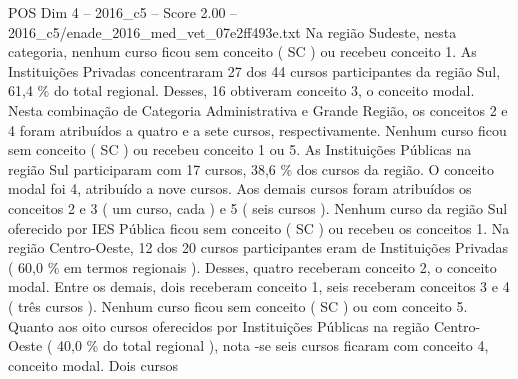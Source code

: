 \begin{textsample}{POS Dim 4 – 2016\_c5 – Score 2.00 – 2016\_c5/enade\_2016\_med\_vet\_07e2ff493e.txt}
Na região Sudeste, nesta categoria, nenhum curso ficou sem conceito ( SC ) ou recebeu conceito 1.
As Instituições Privadas concentraram 27 dos 44 cursos participantes da região Sul, 61,4 \% do total regional.
Desses, 16 obtiveram conceito 3, o conceito modal.
Nesta combinação de Categoria Administrativa e Grande Região, os conceitos 2 e 4 foram atribuídos a quatro e a sete cursos, respectivamente.
Nenhum curso ficou sem conceito ( SC ) ou recebeu conceito 1 ou 5.
As Instituições Públicas na região Sul participaram com 17 cursos, 38,6 \% dos cursos da região.
O conceito modal foi 4, atribuído a nove cursos.
Aos demais cursos foram atribuídos os conceitos 2 e 3 ( um curso, cada ) e 5 ( seis cursos ).
Nenhum curso da região Sul oferecido por IES Pública ficou sem conceito ( SC ) ou recebeu os conceitos 1.
Na região Centro-Oeste, 12 dos 20 cursos participantes eram de Instituições Privadas ( 60,0 \% em termos regionais ).
Desses, quatro receberam conceito 2, o conceito modal.
Entre os demais, dois receberam conceito 1, seis receberam conceitos 3 e 4 ( três cursos ).
Nenhum curso ficou sem conceito ( SC ) ou com conceito 5.
Quanto aos oito cursos oferecidos por Instituições Públicas na região Centro-Oeste ( 40,0 \% do total regional ), nota -se seis cursos ficaram com conceito 4, conceito modal.
Dois cursos

\end{textsample}
